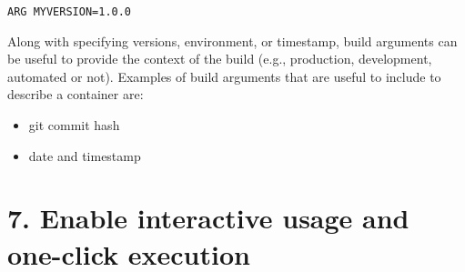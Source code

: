 \documentclass[10pt,letterpaper]{article}
\providecommand{\tightlist}{%
  \setlength{\itemsep}{0pt}\setlength{\parskip}{0pt}}
\begin{document}
\begin{verbatim}
ARG MYVERSION=1.0.0
\end{verbatim}

Along with specifying versions, environment, or timestamp, build
arguments can be useful to provide the context of the build (e.g.,
production, development, automated or not). Examples of build arguments
that are useful to include to describe a container are:

\begin{itemize}
\tightlist
\item
  git commit hash
\item
  date and timestamp
\end{itemize}

\hypertarget{enable-interactive-usage-and-one-click-execution}{%
\section*{7. Enable interactive usage and one-click
execution}\label{enable-interactive-usage-and-one-click-execution}}
\end{document}
